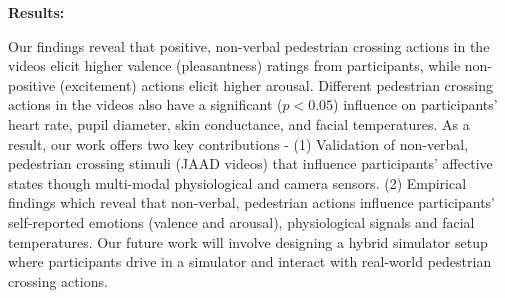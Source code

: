 \documentclass[acmlarge]{acmart}
\begin{document}
\noindent \textbf{Results:} 

Our findings reveal that positive, non-verbal pedestrian crossing actions in the videos elicit higher valence (pleasantness) ratings from participants, while non-positive (excitement) actions elicit higher arousal. Different pedestrian crossing actions in the videos also have a significant ($p<0.05$) influence on participants' heart rate, pupil diameter, skin conductance, and facial temperatures. As a result, our work offers two key contributions -  (1) Validation of non-verbal, pedestrian crossing stimuli (JAAD videos) that influence participants' affective states though multi-modal physiological and camera sensors. (2) Empirical findings which reveal that non-verbal, pedestrian actions influence participants' self-reported emotions (valence and arousal), physiological signals and facial temperatures. Our future work will involve designing a hybrid simulator setup where participants drive in a simulator and interact with real-world pedestrian crossing actions.










\end{document}
